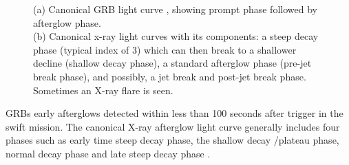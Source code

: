 \begin{figure}[hpbt]
\caption{(a)  Canonical GRB light curve , showing prompt phase  followed by afterglow phase.\\ (b) Canonical x-ray light curves with its  components: a steep decay phase (typical index of 3) which can then break to a shallower decline (shallow decay phase), a standard afterglow phase (pre-jet break phase), and possibly, a jet break and post-jet break phase. Sometimes an X-ray flare is seen.}
\label{Fg: Theoritical interpretation of X-ray afterglow}
\end{figure}
GRBs early afterglows detected within less than 100 seconds after trigger
in the swift mission. The canonical X-ray afterglow light curve generally includes
four phases such as early time steep decay phase, the shallow decay /plateau
phase, normal decay phase and late steep decay phase \citep{33}.\\\\
